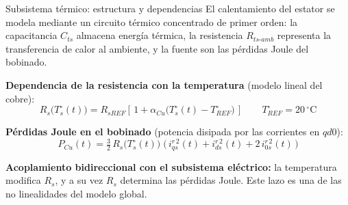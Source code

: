 \documentclass[aspectratio=169,t]{beamer}
\begin{document}
\begin{frame}{Subsistema térmico: estructura y dependencias}
{\small\color{uncGray}El calentamiento del estator se modela mediante un circuito térmico concentrado de primer orden: la capacitancia $C_{ts}$ almacena energía térmica, la resistencia $R_{ts\text{-}amb}$ representa la transferencia de calor al ambiente, y la fuente son las pérdidas Joule del bobinado.}\par
\vspace{4mm}

\textbf{Dependencia de la resistencia con la temperatura} (modelo lineal del cobre):
\begin{equation*}
R_s\!\big(T_s^\circ(t)\big) = R_{sREF}\!\left[\,1 + \alpha_{Cu}\!\big(T_s^\circ(t) - T_{REF}^\circ\big)\,\right]
\qquad T_{REF}^\circ = 20\,^\circ\text{C}
\end{equation*}

\textbf{Pérdidas Joule en el bobinado} (potencia disipada por las corrientes en $qd0$):
\begin{equation*}
P_{Cu}(t) = \tfrac{3}{2}\,R_s\!\big(T_s^\circ(t)\big)\;\big(\,i_{qs}^{r\,2}(t) + i_{ds}^{r\,2}(t) + 2\,i_{0s}^{r\,2}(t)\,\big)
\end{equation*}

\vspace{2mm}
{\small \textbf{Acoplamiento bidireccional con el subsistema eléctrico:} la temperatura modifica $R_s$, y a su vez $R_s$ determina las pérdidas Joule. Este lazo es una de las no linealidades del modelo global.}
\end{frame}
\end{document}
